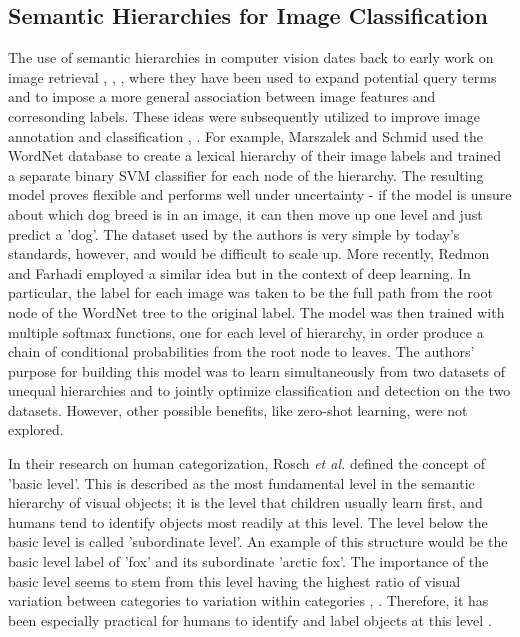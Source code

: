 \documentclass[12pt]{report}
\begin{document}
\subsection{Semantic Hierarchies for Image Classification}
The use of semantic hierarchies in computer vision dates back to early work on image retrieval \cite{Aslandogan1997}, \cite{Zhao2001}, \cite{Grosky2002} \cite{Barnard2001}, where they have been used to expand potential query terms and to impose a more general association between image features and corresonding labels. These ideas were subsequently utilized to improve image annotation and classification \cite{Srikanth2005}, \cite{Marszaek2007} \cite{Griffin2013}. For example, Marszalek and Schmid \cite{Marszaek2007} used the WordNet database \cite{Miller1995} to create a lexical hierarchy of their image labels and trained a separate binary SVM classifier \cite{Scholkopf2002} for each node of the hierarchy. The resulting model proves flexible and performs well under uncertainty - if the model is unsure about which dog breed is in an image, it can then move up one level and just predict a 'dog'. The dataset used by the authors is very simple by today's standards, however, and would be difficult to scale up. More recently, Redmon and Farhadi \cite{Redmon} employed a similar idea but in the context of deep learning. In particular, the label for each image was taken to be the full path from the root node of the WordNet tree to the original label. The model was then trained with multiple softmax functions, one for each level of hierarchy, in order produce a chain of conditional probabilities from the root node to leaves. The authors' purpose for building this model was to learn simultaneously from two datasets of unequal hierarchies and to jointly optimize classification and detection on the two datasets. However, other possible benefits, like zero-shot learning, were not explored. 

In their research on human categorization, Rosch \textit{et al.} \cite{Rosch1976} defined the concept of 'basic level'. This is described as the most fundamental level in the semantic hierarchy of visual objects; it is the level that children usually learn first, and humans tend to identify objects most readily at this level. The level below the basic level is called 'subordinate level'. An example of this structure would be the basic level label of 'fox' and its subordinate 'arctic fox'. The importance of the basic level seems to stem from this level having the highest ratio of visual variation between categories to variation within categories \cite{Rosch1976}, \cite{Joliceur1984}. Therefore, it has been especially practical for humans to identify and label objects at this level \cite{Joliceur1984}. 
\end{document}
